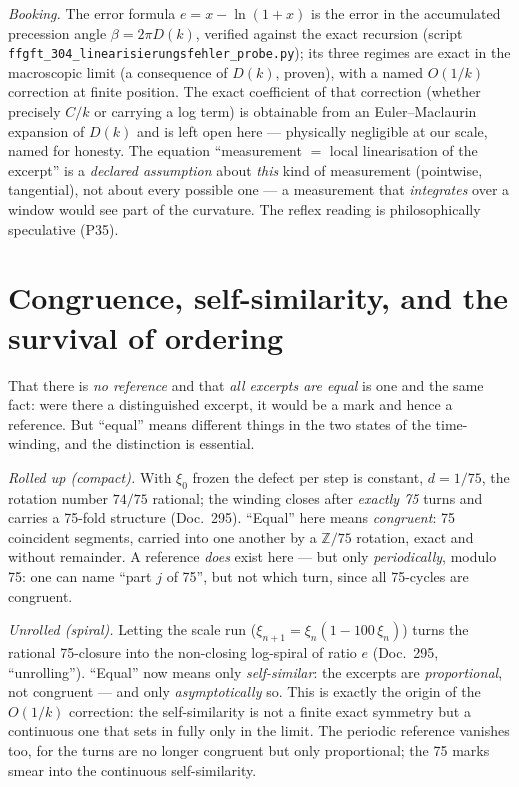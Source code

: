 \emph{Booking.} The error formula $e = x-\ln(1+x)$ is the error in the accumulated
precession angle $\beta=2\pi D(k)$, verified against the exact recursion
(script \texttt{ffgft\_304\_linearisierungsfehler\_probe.py}); its three regimes
are exact in the macroscopic limit (a consequence of $D(k)$, proven), with a named $O(1/k)$
correction at finite position. The exact coefficient of that correction (whether precisely
$C/k$ or carrying a log term) is obtainable from an Euler--Maclaurin expansion of $D(k)$ and
is left open here --- physically negligible at our scale, named for honesty. The equation
\enquote{measurement $=$ local linearisation of the excerpt} is a \emph{declared assumption}
about \emph{this} kind of measurement (pointwise, tangential), not about every possible one
--- a measurement that \emph{integrates} over a window would see part of the curvature. The
reflex reading is philosophically speculative (P35).

\section{Congruence, self-similarity, and the survival of ordering}

That there is \emph{no reference} and that \emph{all excerpts are equal} is one and the same
fact: were there a distinguished excerpt, it would be a mark and hence a reference. But
\enquote{equal} means different things in the two states of the time-winding, and the
distinction is essential.

\emph{Rolled up (compact).} With $\xi_0$ frozen the defect per step is constant, $d=1/75$,
the rotation number $74/75$ rational; the winding closes after \emph{exactly 75} turns and
carries a 75-fold structure (Doc.~295). \enquote{Equal} here means \emph{congruent}: 75
coincident segments, carried into one another by a $\mathbb{Z}/75$ rotation, exact and
without remainder. A reference \emph{does} exist here --- but only \emph{periodically}, modulo
75: one can name \enquote{part $j$ of 75}, but not which turn, since all 75-cycles are
congruent.

\emph{Unrolled (spiral).} Letting the scale run ($\xi_{n+1}=\xi_n(1-100\,\xi_n)$) turns the
rational 75-closure into the non-closing log-spiral of ratio $e$ (Doc.~295,
\enquote{unrolling}). \enquote{Equal} now means only \emph{self-similar}: the excerpts are
\emph{proportional}, not congruent --- and only \emph{asymptotically} so. This is exactly the
origin of the $O(1/k)$ correction: the self-similarity is not a finite exact symmetry but a
continuous one that sets in fully only in the limit. The periodic reference vanishes too, for
the turns are no longer congruent but only proportional; the 75 marks smear into the
continuous self-similarity.

